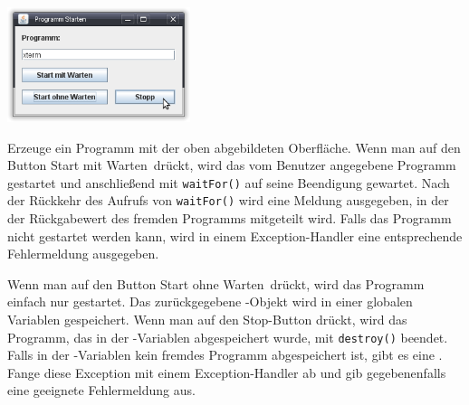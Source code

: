 \begin{center}
\includegraphics[width=0.4\textwidth]{./inf/SEKII/25_Java_Exceptions/ProgrammStart.png}
\end{center}

Erzeuge ein Programm mit der oben abgebildeten Oberfläche. Wenn man auf den
Button \glqq Start mit Warten\grqq\ drückt, wird das vom Benutzer angegebene
Programm gestartet und anschließend mit \lstinline|waitFor()| auf seine
Beendigung gewartet. Nach der Rückkehr des Aufrufs von \lstinline|waitFor()|
wird eine Meldung ausgegeben, in der der Rückgabewert des fremden Programms
mitgeteilt wird. Falls das Programm nicht gestartet werden kann, wird in einem
Exception-Handler eine entsprechende Fehlermeldung ausgegeben.

Wenn man auf den Button \glqq Start ohne Warten\grqq\ drückt, wird das Programm
einfach nur gestartet. Das zurückgegebene -Objekt wird in einer
globalen Variablen gespeichert. Wenn man auf den Stop-Button drückt, wird das
Programm, das in der -Variablen abgespeichert wurde, mit
\lstinline|destroy()| beendet. Falls in der -Variablen kein
fremdes Programm abgespeichert ist, gibt es eine .
Fange diese Exception mit einem Exception-Handler ab und gib gegebenenfalls
eine geeignete Fehlermeldung aus.
